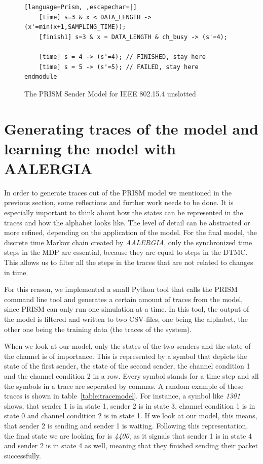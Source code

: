 \documentclass[
a4paper,
12pt
]{scrartcl}
\begin{document}
\begin{figure}[H]
\begin{lstlisting}[language=Prism, ,escapechar=|]
	[time] s=3 & x < DATA_LENGTH -> (x'=min(x+1,SAMPLING_TIME));
	[finish1] s=3 & x = DATA_LENGTH & ch_busy -> (s'=4);

	[time] s = 4 -> (s'=4); // FINISHED, stay here
	[time] s = 5 -> (s'=5); // FAILED, stay here
endmodule

\end{lstlisting}
\caption{The PRISM Sender Model for IEEE 802.15.4 unslotted}
\label{fig:sendermodel}
\end{figure}

\newpage
\section{Generating traces of the model and learning the model with AALERGIA}
In order to generate traces out of the PRISM model we mentioned in the previous section, some reflections and further work needs to be done. It is especially important to think about how the states can be represented in the traces and how the alphabet looks like. The level of detail can be abstracted or more refined, depending on the application of the model. For the final model, the discrete time Markov chain created by \emph{AALERGIA}, only the synchronized time steps in the MDP are essential, because they are equal to steps in the DTMC. This allows us to filter all the steps in the traces that are not related to changes in time.

\par For this reason, we implemented a small Python tool that calls the PRISM command line tool and generates a certain amount of traces from the model, since PRISM can only run one simulation at a time. In this tool, the output of the model is filtered and written to two CSV-files, one being the alphabet, the other one being the training data (the traces of the system).

\par When we look at our model, only the states of the two senders and the state of the channel is of importance. This is represented by a symbol that depicts the state of the first sender, the state of the second sender, the channel condition 1 and the channel condition 2 in a row. Every symbol stands for a time step and all the symbols in a trace are seperated by commas. A random example of these traces is shown in table~\ref{table:tracemodel}. For instance, a symbol like \textit{1301} shows, that sender 1 is in state 1, sender 2 is in state 3, channel condition 1 is in state 0 and channel condition 2 is in state 1. If we look at our model, this means, that sender 2 is sending and sender 1 is waiting. Following this representation, the final state we are looking for is \textit{4400}, as it signals that sender 1 is in state 4 and sender 2 is in state 4 as well, meaning that they finished sending their packet successfully.
\end{document}
